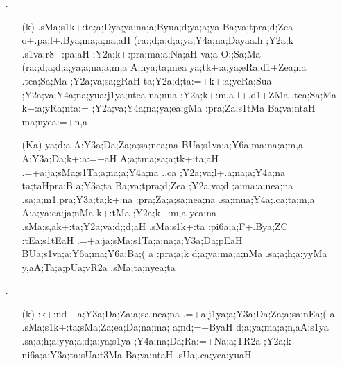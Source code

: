 \begin{itemize}                 
  \item[{\sktf 31}.] \begin{itemize}
                 
                 \item[({\sktf k})] {\sktf .sMa;s1k+:ta;a;Dya;ya;na;a;Byua;d;ya;a;ya Ba;va;tpra;d;Zea
o+.pa;l+.Bya;ma;a;na;aH (ra:;d;a;d;a;ya;Y4a;na;Da}{\sktf yaa.h} {\sktf ;Y2a;k .s1va:r8+:pa;aH
;Y2a;k+:pra;ma;a;Na;aH va;a O;;Sa;Ma
(ra:;d;a;d;a;ya;a;na;a;m,a A;nya;ta;mea\ZF{,}
ya;tk+:a;ya;eRa;d1+Zea;na .tea;Sa;Ma ;Y2a;va;sa;gRaH\ZF{,} ta;Y2a;d;ta:=+k+:a;yeRa;Sua ;Y2a;va;Y4a;na;yua:j1ya;ntea na;nua
;Y2a;k+:m,a I+.d1+ZMa .tea;Sa;Ma k+:a;yRa;nta:=
;Y2a;va;Y4a;na;ya;ea;gMa :pra;Za;s1tMa Ba;va;ntaH ma;nyea:=+n,a}
                 
                 \item[({\sktf Ka})] {\sktf ya;d;a A;Y3a;Da;Za;a;sa;nea;na
BUa;s1va;a;Y6a;ma;na;a;m,a A;Y3a;Da;k+:a:=+aH
A;a;tma;sa;a;tk+:ta;aH\ZF{,}
.=+a:ja;sMa;s1Ta;a;na;a;Y4a;na ..ca ;Y2a;va;l+.a;na;a;Y4a;na\ZF{,} ta;taHpra;B%
a;Y3a;ta Ba;va;tpra;d;Zea ;Y2a;va;d%
;a;ma;a;nea;na .sa;a;m1.pra;Y3a;ta;k+:na
:pra;Za;a;sa;nea;na .sa;mua;Y4a;.ca;ta;m,a A;a;ya;ea:ja;nMa
k+:tMa ;Y2a;k+:m,a\ZF{,} yea;na .sMa;s,ak+:ta;Y2a;va;d;;d;aH
.sMa;s1k+:ta :pi6a;a;F+.Bya;ZC :tEa;s1tEaH
.=+a:ja;sMa;s1Ta;a;na;a;Y3a;Da;pEaH BUa;s1va;a;Y6a;ma;Y6a;Ba;(%
a :pra;a;k d;a;ya;ma;a;nMa .sa;a;h;a;yyMa y,aA;Ta;a;pUa;vR2a .sMa;ta;nyea;ta }
  
                \end{itemize} 
                
\item[{\sktf 32}.] \begin{itemize}
               
               \item[({\sktf k})] {\sktf :k+:nd%
+a;Y3a;Da;Za;a;sa;nea;na .=+a:j1ya;a;Y3a;Da;Za;a;sa;nEa;(%
a .sMa;s1k+:ta;sMa;Za;ea;Da;na;ma;%
a;nd;=+ByaH d;a;ya;ma;a;n,aA;s1ya .sa;a;h;a;yya;a;d;a;ya;s1ya ;Y4a;na;Da;Ra:=+Na;a;TR2a ;Y2a;k
ni6a;a;Y3a;ta;sUa:t3Ma Ba;va;ntaH .sUa;.ca;yea;yuaH}  
                

\end{itemize}
\end{itemize}
